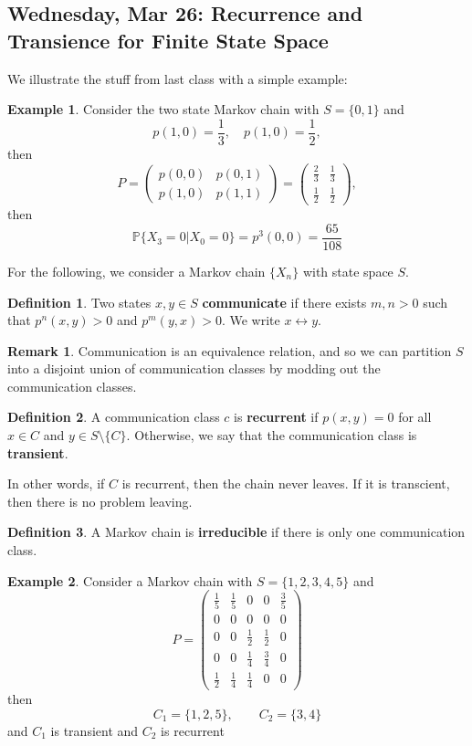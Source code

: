 \documentclass[10pt, oneside]{article}
\newcommand{\bbP}{\mathbb{P}}
\theoremstyle{definition}
\newtheorem{exmp}{Example}[section]
\newtheorem{defn}{Definition}
\newtheorem{rem}{Remark}
\begin{document}
\subsection{Wednesday, Mar 26: Recurrence and Transience for Finite State Space}
We illustrate the stuff from last class with a simple example:
\begin{exmp}
    Consider the two state Markov chain with $S = \{0,1\}$ and 
    \[p(1,0) = \frac{1}{3}, \quad p(1,0) = \frac{1}{2},\] then 
    \[P = \begin{pmatrix}
        p(0,0) & p(0,1)\\
        p(1,0) & p(1,1) 
    \end{pmatrix} = \begin{pmatrix}
        \frac{2}{3} & \frac{1}{3}\\
        \frac{1}{2} & \frac{1}{2}
    \end{pmatrix},\] then 
    \[\bbP\{X_3 = 0 | X_0 = 0\} = p^3(0,0) = \frac{65}{108}\]
\end{exmp}
For the following, we consider a Markov chain $\{X_n\}$ with state space $S.$
\begin{defn}
    Two states $x,y \in S$ \textbf{communicate} if there exists $m,n >0$ such that $p^n(x,y) >0$ and $p^m(y,x) > 0 .$ We write $x \leftrightarrow y.$
\end{defn}
\begin{rem}
    Communication is an equivalence relation, and so we can partition $S$ into a disjoint union of communication classes by modding out the communication classes.
\end{rem}
\begin{defn}
    A communication class $c$ is \textbf{recurrent} if $p(x,y) = 0$ for all $x\in C$ and $y \in S\setminus\{C\}.$ Otherwise, we say that the communication class is \textbf{transient}.
\end{defn}
In other words, if $C$ is recurrent, then the chain never leaves. If it is transcient, then there is no problem leaving.


\begin{defn}
    A Markov chain is \textbf{irreducible} if there is only one communication class.
\end{defn}

\begin{exmp}
    Consider a Markov chain with $S  = \{1,2,3,4,5\}$ and 
    \[P = \begin{pmatrix}
        \frac{1}{5} & \frac{1}{5} & 0 & 0 & \frac{3}{5}\\
        0 & 0 & 0 & 0 & 0 \\
        0 & 0 & \frac{1}{2} & \frac{1}{2} & 0\\
        0 & 0 & \frac{1}{4} & \frac{3}{4} & 0\\
        \frac{1}{2} & \frac{1}{4} & \frac{1}{4} & 0 & 0
    \end{pmatrix}\] then 
    \[C_1 = \{1,2,5\}, \qquad C_2 = \{3,4\}\] and $C_1$ is transient and $C_2$ is recurrent
\end{exmp}
\end{document}
